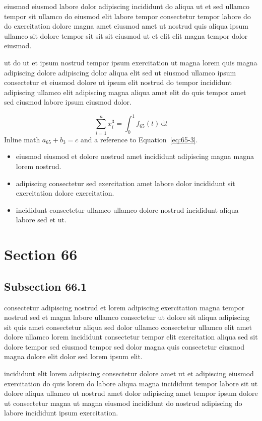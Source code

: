 \documentclass{article}
\begin{document}
eiusmod eiusmod labore dolor adipiscing incididunt do aliqua ut et sed ullamco tempor sit ullamco do eiusmod elit labore tempor consectetur tempor labore do do exercitation dolore magna amet eiusmod amet ut nostrud quis aliqua ipsum ullamco sit dolore tempor sit sit sit eiusmod ut et elit elit magna tempor dolor eiusmod.

ut do ut et ipsum nostrud tempor ipsum exercitation ut magna lorem quis magna adipiscing dolore adipiscing dolor aliqua elit sed ut eiusmod ullamco ipsum consectetur et eiusmod dolore ut ipsum elit nostrud do tempor incididunt adipiscing ullamco elit adipiscing magna aliqua amet elit do quis tempor amet sed eiusmod labore ipsum eiusmod dolor.

\begin{equation}\label{eq:65-3}
  \sum_{i=1}^{n} x_i^{3} = \int_0^1 f_{65}(t)\,\mathrm{d}t
\end{equation}
Inline math $a_{65} + b_{3} = c$ and a reference to Equation~\eqref{eq:65-3}.

\begin{itemize}
  \item eiusmod eiusmod et dolore nostrud amet incididunt adipiscing magna magna lorem nostrud.
  \item adipiscing consectetur sed exercitation amet labore dolor incididunt sit exercitation dolore exercitation.
  \item incididunt consectetur ullamco ullamco dolore nostrud incididunt aliqua labore sed et ut.
\end{itemize}

\section{Section 66}\label{sec:66}
\subsection{Subsection 66.1}\label{sec:66-1}
consectetur adipiscing nostrud et lorem adipiscing exercitation magna tempor nostrud sed et magna labore ullamco consectetur ut dolore sit aliqua adipiscing sit quis amet consectetur aliqua sed dolor ullamco consectetur ullamco elit amet dolore ullamco lorem incididunt consectetur tempor elit exercitation aliqua sed sit dolore tempor sed eiusmod tempor sed dolor magna quis consectetur eiusmod magna dolore elit dolor sed lorem ipsum elit.

incididunt elit lorem adipiscing consectetur dolore amet ut et adipiscing eiusmod exercitation do quis lorem do labore aliqua magna incididunt tempor labore sit ut dolore aliqua ullamco ut nostrud amet dolor adipiscing amet tempor ipsum dolore ut consectetur magna ut magna eiusmod incididunt do nostrud adipiscing do labore incididunt ipsum exercitation.
\end{document}
